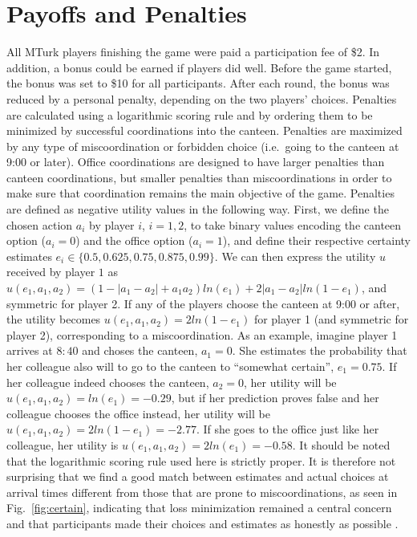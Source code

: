 \documentclass[twocolumn,a4paper,superscriptaddress,nofootinbib]{revtex4}
\begin{document}
\section{Payoffs and Penalties} \label{appendix:payoffs}
 All MTurk players finishing the game were paid a participation fee of \$2. In addition, a bonus could be earned if players did well. Before the game started, the bonus was set to \$10 for all participants. After each round, the bonus was reduced by a personal penalty, depending on the two players' choices. Penalties are calculated using a logarithmic scoring rule and by ordering them to be minimized by successful coordinations into the canteen. Penalties are maximized by any type of miscoordination or forbidden choice (i.e.\ going to the canteen at 9:00 or later). Office coordinations are designed to have larger penalties than canteen coordinations, but smaller penalties than miscoordinations in order to make sure that coordination remains the main objective of the game. Penalties are defined as negative utility values in the following way. First, we define the chosen action $a_i$ by player $i$, $i=1,2$, to take binary values encoding the canteen option ($a_i=0$) and the office option ($a_i=1$), and define their respective certainty estimates $e_i \in \{0.5, 0.625, 0.75, 0.875, 0.99\}$. We can then express the utility $u$ received by player $1$ as $u(e_1, a_1, a_2) = (1-|a_1-a_2| + a_1a_2)ln(e_1) + 2|a_1-a_2|ln(1-e_1)$, and symmetric for player 2. If any of the players choose the canteen at 9:00 or after, the utility becomes $u(e_1,a_1,a_2) = 2ln(1-e_1)$ for player 1 (and symmetric for player 2), corresponding to a miscoordination. As an example, imagine player 1 arrives at $8{:}40$ and choses the canteen, $a_1=0$. She estimates the probability that her colleague also will to go to the canteen to ``somewhat certain'', $e_1=0.75$. If her colleague indeed chooses the canteen, $a_2=0$, her utility will be $u(e_1,a_1,a_2) = ln(e_1) = -0.29$, but if her prediction proves false and her colleague chooses the office instead, her utility will be $u(e_1,a_1,a_2) = 2ln(1-e_1)=-2.77$. If she goes to the office just like her colleague, her utility is $u(e_1,a_1,a_2) = 2ln(e_1)=-0.58$. It should be noted that the logarithmic scoring rule used here is strictly proper. It is therefore not surprising that we find a good match between estimates and actual choices at arrival times different from those that are prone to miscoordinations, as seen in Fig.~\ref{fig:certain}, indicating that loss minimization remained a central concern and that participants made their choices and estimates as honestly as possible \citep{good1992rational, seidenfeld1985calibration, palfrey2009eliciting}.
\end{document}

